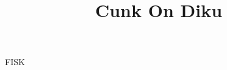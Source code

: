 \documentclass[a4paper,11pt]{article}
\title{Cunk On Diku}
\begin{document}
\maketitle
\begin{song}
FISK
\end{song}
\end{document}

